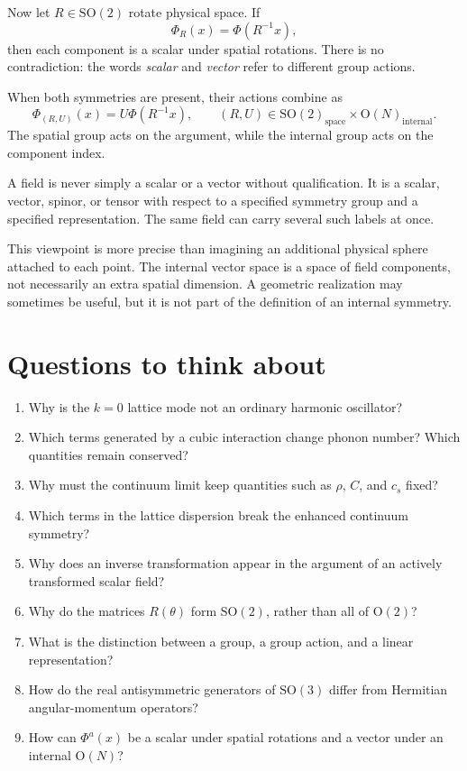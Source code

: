 \documentclass[11pt]{article}
\newcommand{\SO}{\mathrm{SO}}
\newcommand{\OO}{\mathrm{O}}
\begin{document}
Now let \(R\in\SO(2)\) rotate physical space.  If
\begin{equation}
  \Phi_R(x)=\Phi(R^{-1}x),
  \label{eq:spatialScalarMultiplet}
\end{equation}
then each component is a scalar under spatial rotations.  There is no
contradiction: the words \emph{scalar} and \emph{vector} refer to different
group actions.

When both symmetries are present, their actions combine as
\begin{equation}
  \Phi_{(R,U)}(x)=U\Phi(R^{-1}x),
  \qquad
  (R,U)\in
  \SO(2)_{\mathrm{space}}\times\OO(N)_{\mathrm{internal}}.
  \label{eq:combinedSpaceInternalAction}
\end{equation}
The spatial group acts on the argument, while the internal group acts on the
component index.

\begin{keyidea}
A field is never simply a scalar or a vector without qualification.  It is a
scalar, vector, spinor, or tensor with respect to a specified symmetry group
and a specified representation.  The same field can carry several such
labels at once.
\end{keyidea}

This viewpoint is more precise than imagining an additional physical sphere
attached to each point.  The internal vector space is a space of field
components, not necessarily an extra spatial dimension.  A geometric
realization may sometimes be useful, but it is not part of the definition of
an internal symmetry.

\section{Questions to think about}

\begin{enumerate}
  \item Why is the \(k=0\) lattice mode not an ordinary harmonic oscillator?
  \item Which terms generated by a cubic interaction change phonon number?
  Which quantities remain conserved?
  \item Why must the continuum limit keep quantities such as \(\rho\), \(C\),
  and \(c_s\) fixed?
  \item Which terms in the lattice dispersion break the enhanced continuum
  symmetry?
  \item Why does an inverse transformation appear in the argument of an
  actively transformed scalar field?
  \item Why do the matrices \(R(\theta)\) form \(\SO(2)\), rather than all of
  \(\OO(2)\)?
  \item What is the distinction between a group, a group action, and a linear
  representation?
  \item How do the real antisymmetric generators of \(\SO(3)\) differ from
  Hermitian angular-momentum operators?
  \item How can \(\Phi^a(x)\) be a scalar under spatial rotations and a vector
  under an internal \(\OO(N)\)?
\end{enumerate}
\end{document}
